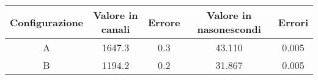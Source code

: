 \begin{center}
\begin{tabulary}{\textwidth}{CCCCC}
\toprule
Configurazione	& Valore in canali	& Errore	& Valore in nasonescondi	& Errori	\\ \midrule
A		& 1647.3		& 0.3		& 43.110			& 0.005		\\ \midrule
B		& 1194.2		& 0.2		& 31.867			& 0.005		\\
\bottomrule
\end{tabulary}
\end{center} 

